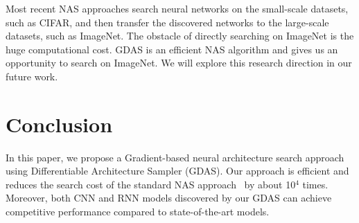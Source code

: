 \documentclass[10pt,twocolumn,letterpaper]{article}
\begin{document}
Most recent NAS approaches search neural networks on the small-scale datasets, such as CIFAR, and then transfer the discovered networks to the large-scale datasets, such as ImageNet. The obstacle of directly searching on ImageNet is the huge computational cost. GDAS is an efficient NAS algorithm and gives us an opportunity to search on ImageNet. We will explore this research direction in our future work.





\section{Conclusion}

In this paper, we propose a Gradient-based neural architecture search approach using Differentiable Architecture Sampler (GDAS).
Our approach is efficient and reduces the search cost of the standard NAS approach~\cite{Zoph_2018_CVPR} by about 10$^{4}$ times.
Moreover, both CNN and RNN models discovered by our GDAS can achieve competitive performance compared to state-of-the-art models.

{\small


}
\end{document}
